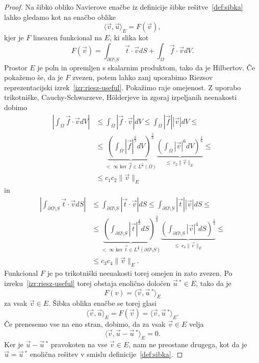 \documentclass[12pt,a4paper,twoside]{article}
\theoremstyle{definition} %
\theoremstyle{plain} %
\numberwithin{equation}{section}
\newcommand{\vv}{\vec{v}}
\newcommand{\vt}{\vec{t}}
\newcommand{\vu}{\vec{u}}
\newcommand{\vf}{\vec{f}}
\begin{document}
\begin{proof}
Na šibko obliko Navierove enačbe iz definicije šibke rešitve~\ref{def:sibka}
lahko gledamo kot na enačbo oblike
\begin{equation*}
  \langle \vv, \vu \rangle_E = F(\vv),
\end{equation*}
kjer je $F$ linearen funkcional na $E$, ki slika kot
\begin{equation*}
  F(\vv) = \int_{\partial \Omega\setminus S} \vt\cdot \vv dS + \int_{\Omega} \vf\cdot \vv dV.
\end{equation*}
Prostor $E$ je poln in opremljen s skalarnim produktom, tako da je Hilbertov.
Če pokažemo še, da je $F$ zvezen, potem lahko zanj uporabimo Riezsov
reprezentacijski izrek~\ref{izr:riesz-useful}. Pokažimo raje omejenost. Z
uporabo trikotniške, Cauchy-Schwarzeve, H\"olderjeve in zgoraj izpeljanih
neenakosti dobimo
\begin{align*}
  \left| \int_\Omega \vf \cdot \vv dV \right| &\leq
  \int_\Omega \left|\vf \cdot \vv \right| dV \leq
  \int_\Omega |\vf| |\vv| dV \leq \\
  &\leq \underbrace{\left(\int_\Omega |\vf|^\frac65 dV \right)^\frac56}_{<\;\infty
    \text{ ker }\vf \in L^\frac65(\Omega)} \underbrace{\left( \int_\Omega
    |\vv|^6dV\right)^\frac16}_{\leq \; c_2 \|\vv\|_E} \leq \\
    &\leq c_1 c_2 \|\vv\|_E
\end{align*}
in
\begin{align*}
  \left| \int_{\partial \Omega \setminus S} \vt \cdot \vv dS \right| &\leq
  \int_{\partial \Omega \setminus S} \left|\vt \cdot \vv \right| dS \leq
  \int_{\partial \Omega \setminus S} |\vt| |\vv| dS \leq \\
  &\leq \underbrace{\left(\int_{\partial \Omega \setminus S} |\vt|^\frac43 dS \right)^\frac34}_{<\;\infty
    \text{ ker }\vt \in L^\frac43({\partial \Omega \setminus S})} \underbrace{\left( \int_{\partial \Omega \setminus S}
    |\vv|^4dS\right)^\frac14}_{\leq \; c_4 \|\vv\|_E} \leq \\
    &\leq c_3 c_4 \|\vv\|_E.
\end{align*}
Funkcional $F$ je po trikotniški neenakosti torej omejen in zato zvezen. Po
izreku~\ref{izr:riesz-useful} torej obstaja enolično določen $\vu\,^\ast \in E$,
tako da je
\begin{equation*}
   F(v) = \langle \vv, \vu\,^\ast \rangle_E
\end{equation*}
za vsak $\vv \in E$. Šibka oblika enačbe se torej glasi
\begin{equation*}
   \langle \vv, \vu \rangle_E = F(\vv) = \langle \vv, \vu\,^\ast \rangle_E.
\end{equation*}
Če prenesemo vse na eno stran, dobimo, da za vsak $\vv \in E$ velja
\begin{equation*}
   \langle \vv, \vu - \vu\,^\ast \rangle_E = 0.
\end{equation*}
Ker je $\vu-\vu\,^\ast$ pravokoten na vse $\vv \in E$, nam ne preostane drugega,
kot da je $\vu = \vu\,^\ast$ enolična rešitev v smislu definicije~\ref{def:sibka}.
\end{proof}
\end{document}
